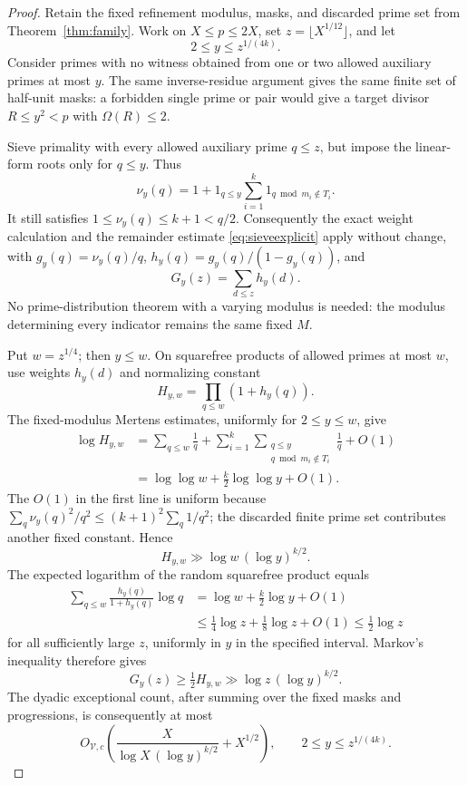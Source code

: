 \documentclass[11pt]{article}
\theoremstyle{remark}\newtheorem{remark}[theorem]{Remark}
\newcommand{\Om}{\Omega}
\begin{document}
\begin{proof}
Retain the fixed refinement modulus, masks, and discarded prime set from Theorem~\ref{thm:family}. Work on $X\le p\le2X$, set $z=\lfloor X^{1/12}\rfloor$, and let
\[
 2\le y\le z^{1/(4k)}.
\]
Consider primes with no witness obtained from one or two allowed auxiliary primes at most $y$. The same inverse-residue argument gives the same finite set of half-unit masks: a forbidden single prime or pair would give a target divisor $R\le y^2<p$ with $\Om(R)\le2$.

Sieve primality with every allowed auxiliary prime $q\le z$, but impose the linear-form roots only for $q\le y$. Thus
\[
 \nu_y(q)=1+1_{q\le y}\sum_{i=1}^k1_{q\bmod m_i\notin T_i}.
\]
It still satisfies $1\le\nu_y(q)\le k+1<q/2$. Consequently the exact weight calculation and the remainder estimate \eqref{eq:sieveexplicit} apply without change, with $g_y(q)=\nu_y(q)/q$, $h_y(q)=g_y(q)/(1-g_y(q))$, and
\[
 G_y(z)=\sum_{d\le z}h_y(d).
\]
No prime-distribution theorem with a varying modulus is needed: the modulus determining every indicator remains the same fixed $M$.

Put $w=z^{1/4}$; then $y\le w$. On squarefree products of allowed primes at most $w$, use weights $h_y(d)$ and normalizing constant
\[
 H_{y,w}=\prod_{q\le w}(1+h_y(q)).
\]
The fixed-modulus Mertens estimates, uniformly for $2\le y\le w$, give
\begin{align*}
 \log H_{y,w}
 &=\sum_{q\le w}\frac1q+
   \sum_{i=1}^k\sum_{\substack{q\le y\\q\bmod m_i\notin T_i}}\frac1q+O(1)\\
 &=\log\log w+\frac{k}{2}\log\log y+O(1).
\end{align*}
The $O(1)$ in the first line is uniform because
$\sum_q\nu_y(q)^2/q^2\le(k+1)^2\sum_q1/q^2$; the discarded finite prime set contributes another fixed constant. Hence
\[
 H_{y,w}\gg\log w\,(\log y)^{k/2}.
\]
The expected logarithm of the random squarefree product equals
\begin{align*}
 \sum_{q\le w}\frac{h_y(q)}{1+h_y(q)}\log q
 &=\log w+\frac{k}{2}\log y+O(1)\\
 &\le\frac14\log z+\frac18\log z+O(1)
 \le\frac12\log z
\end{align*}
for all sufficiently large $z$, uniformly in $y$ in the specified interval. Markov's inequality therefore gives
\[
 G_y(z)\ge\tfrac12 H_{y,w}
 \gg \log z\,(\log y)^{k/2}.
\]
The dyadic exceptional count, after summing over the fixed masks and progressions, is consequently at most
\begin{equation}\label{eq:twocutoff}
 O_{\mathcal V,c}\!\left(
 \frac{X}{\log X\,(\log y)^{k/2}}+X^{1/2}\right),
 \qquad 2\le y\le z^{1/(4k)}.
\end{equation}


\end{proof}
\end{document}
